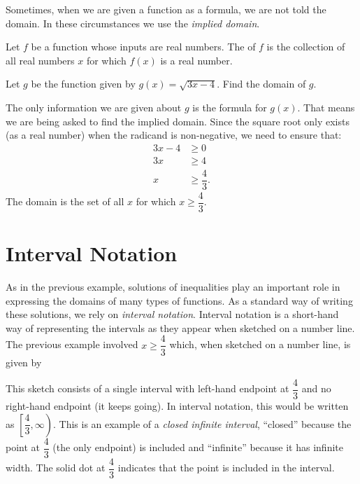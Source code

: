 \documentclass[nooutcomes]{ximera}
\begin{document}
	Sometimes, when we are given a function as a formula, we are not told the domain. In these circumstances we use the \emph{implied domain}.
	\begin{definition}
		Let $f$ be a function whose inputs are real numbers. The  of $f$ is the collection of all real numbers $x$ for which $f(x)$ is a real number.
	\end{definition}

	\begin{example}
		Let $g$ be the function given by $g(x) = \sqrt{3x-4}$. Find the domain of $g$.
		
		\begin{explanation}
			The only information we are given about $g$ is the formula for $g(x)$. That means we are being asked to find the implied domain. Since the square root only exists (as a real number) when the radicand is non-negative,
			we need to ensure that:
			\begin{align*} 
				3x-4 &\geq 0 \\
				3x & \geq 4\\
				x & \geq \dfrac{4}{3}.
			\end{align*}			
			The domain is the set of all $x$ for which $x \geq \dfrac{4}{3}$.
		\end{explanation}
	\end{example}


	\section{Interval Notation}
	As in the previous example, solutions of inequalities play an important role in expressing the domains of many types of functions. As a standard way of writing these solutions, we rely on \emph{interval notation}. Interval notation
	is a short-hand way of representing the intervals as they appear when sketched on a number line. The previous example involved $x \geq \dfrac{4}{3}$ which, when sketched on a number line, is given by
	\begin{image}
	\end{image}
	This sketch consists of a single interval with left-hand endpoint at $\dfrac{4}{3}$ and no right-hand endpoint (it keeps going). In interval notation, this would be written as $\left[ \dfrac{4}{3}, \infty \right)$. This is an example of a \emph{closed infinite interval}, 
	``closed'' because the point at $\dfrac{4}{3}$ (the only endpoint) is included and ``infinite'' because it has infinite width. The solid dot at $\dfrac{4}{3}$ indicates that the point is included in the interval.
	
\end{document}

